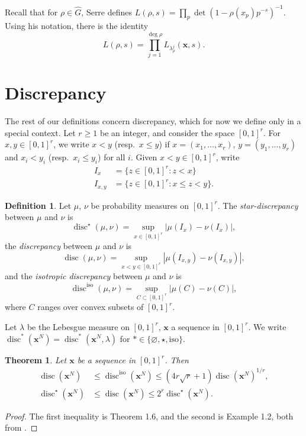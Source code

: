 \documentclass{article}
\DeclareMathOperator{\disc}{disc}
\newcommand{\bx}{{\boldsymbol x}}
\newcommand{\iso}{\mathrm{iso}}
\newtheorem{theorem}[subsection]{Theorem}
\theoremstyle{definition}
\newtheorem{definition}[subsection]{Definition}
\begin{document}
Recall that for $\rho\in \widehat G$, Serre defines 
$L(\rho,s) = \prod_p \det(1-\rho(x_p) p^{-s})^{-1}$. Using his notation, there 
is the identity 
\[
	L(\rho,s) = \prod_{j=1}^{\deg\rho} L_{\lambda_\rho^j}(\bx,s) .
\]





\section{Discrepancy}\label{sec:discrepancy}

The rest of our definitions concern discrepancy, which for now we define only 
in a special context. Let $r\geqslant 1$ be an integer, and consider the space 
$[0,1]^r$. For $x,y\in [0,1]^r$, we write $x<y$ (resp.~$x\leqslant y$) if 
$x=(x_1,\dots,x_r)$, $y=(y_1,\dots,y_r)$ and $x_i<y_i$ 
(resp.~$x_i\leqslant y_i$) for all $i$. Given $x<y\in [0,1]^r$, write 
\begin{align*}
	I_x &= \{z\in [0,1]^r : z<x\} \\
	I_{x,y} &= \{z\in [0,1]^r : x\leqslant z<y\} .
\end{align*}

\begin{definition}
Let $\mu$, $\nu$ be probability measures on $[0,1]^r$. The 
\emph{star-discrepancy} between $\mu$ and $\nu$ is 
\[
	\disc^\star(\mu,\nu) = \sup_{x\in [0,1]^r} |\mu(I_x)-\nu(I_x)| ,
\]
the \emph{discrepancy} between $\mu$ and $\nu$ is 
\[
	\disc(\mu,\nu) = \sup_{x<y\in [0,1]^r} |\mu(I_{x,y})-\nu(I_{x,y})| ,
\]
and the \emph{isotropic discrepancy} between $\mu$ and $\nu$ is 
\[
	\disc^\iso(\mu,\nu) = \sup_{C\subset [0,1]^r} |\mu(C)-\nu(C)| ,
\]
where $C$ ranges over convex subsets of $[0,1]^r$. 
\end{definition}

Let $\lambda$ be the Lebesgue measure on $[0,1]^r$, $\bx$ a sequence in 
$[0,1]^r$. We write $\disc^\ast(\bx^N)=\disc^\ast(\bx^N,\lambda)$ for 
$\ast\in \{\varnothing,\star,\iso\}$. 

\begin{theorem}\label{thm:discrepancy-related}
Let $\bx$ be a sequence in $[0,1]^r$. Then 
\begin{align*}
	\disc(\bx^N) &\leqslant \disc^\iso(\bx^N) \leqslant (4 r \sqrt r+1) \disc(\bx^N)^{1/r} ,\\
	\disc^\star(\bx^N) &\leqslant \disc(\bx^N) \leqslant 2^r \disc^\star(\bx^N) .
\end{align*}
\end{theorem}
\begin{proof}
The first inequality is Theorem 1.6, and the second is Example 1.2, both from 
\cite[Ch.2]{kuipers-niederreiter-1974}. 
\end{proof}
\end{document}
